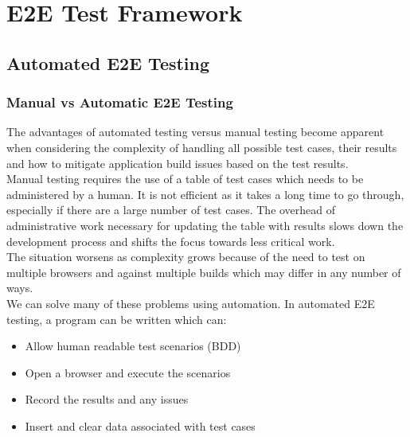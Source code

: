 \chapter{E2E Test Framework}
\label{chap:e2e-test-framework}

\section{Automated E2E Testing}
\label{sec:automated-e2e-testing}

\subsection{Manual vs Automatic E2E Testing}
\label{sec:manual-vs-automatic-e2e-testing}

The advantages of automated testing versus manual testing become apparent when considering the complexity of handling all possible test cases, their results and how to mitigate application build issues based on the test results.
\\

Manual testing requires the use of a table of test cases which needs to be administered by a human. It is not efficient as it takes a long time to go through, especially if there are a large number of test cases. The overhead of administrative work necessary for updating the table with results slows down the development process and shifts the focus towards less critical work.
\\

The situation worsens as complexity grows because of the need to test on multiple browsers and against multiple builds which may differ in any number of ways.
\\

We can solve many of these problems using automation. In automated E2E testing, a program can be written which can:

\begin{itemize}
\item Allow human readable test scenarios (BDD)
\item Open a browser and execute the scenarios
\item Record the results and any issues
\item Insert and clear data associated with test cases
\end{itemize}

